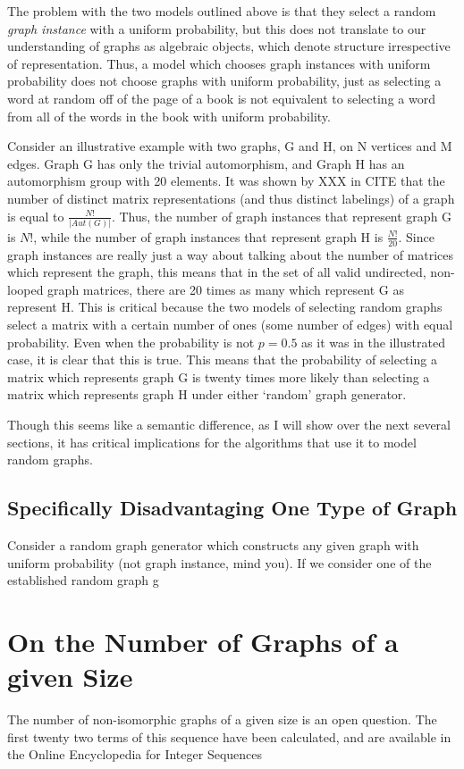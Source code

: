 \documentclass[11pt,a4paper]{report}
\begin{document}
The problem with the two models outlined above is that they select a random \emph{graph instance} with a uniform probability, but this does not translate to our understanding of graphs as algebraic objects, which denote structure irrespective of representation.
Thus, a model which chooses graph instances with uniform probability does not choose graphs with uniform probability, just as selecting a word at random off of the page of a book is not equivalent to selecting a word from all of the words in the book with uniform probability.

Consider an illustrative example with two graphs, G and H, on N vertices and M edges.
Graph G has only the trivial automorphism, and Graph H has an automorphism group with 20 elements.
It was shown by XXX in CITE that the number of distinct matrix representations (and thus distinct labelings) of a graph is equal to $\frac{N!}{|Aut(G)|}$.
Thus, the number of graph instances that represent graph G is $N!$, while the number of graph instances that represent graph H is $\frac{N!}{20}$.
Since graph instances are really just a way about talking about the number of matrices which represent the graph, this means that in the set of all valid undirected, non-looped graph matrices, there are 20 times as many which represent G as represent H.
This is critical because the two models of selecting random graphs select a matrix with a certain number of ones (some number of edges) with equal probability.
Even when the probability is not $p=0.5$ as it was in the illustrated case, it is clear that this is true.
This means that the probability of selecting a matrix which represents graph G is twenty times more likely than selecting a matrix which represents graph H under either `random' graph generator.

Though this seems like a semantic difference, as I will show over the next several sections, it has critical implications for the algorithms that use it to model random graphs.

\subsection{Specifically Disadvantaging One Type of Graph}

Consider a random graph generator which constructs any given graph with uniform probability (not graph instance, mind you).
If we consider one of the established random graph g

\section{On the Number of Graphs of a given Size}
The number of non-isomorphic graphs of a given size is an open question.
The first twenty two terms of this sequence have been calculated, and are available in the Online Encyclopedia for Integer Sequences\cite{OEIS}
\end{document}
